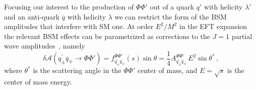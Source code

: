 Focusing our interest to the production of $\Phi\Phi'$ out of a quark $q'$ with helicity $\lambda'$ and an anti-quark ${\overline{q}}$ with helicity $\lambda$ we can restrict the form of the BSM amplitudes that interfere with SM one.
At order  $E^2/M^2$ in the EFT expansion the relevant BSM effects can be parametrized as corrections to the $J=1$ partial wave amplitudes~\cite{Franceschini:2017ab}, namely
\begin{equation}\label{amp0}
\delta{\mathcal{A}}\left(q^\prime_{\pm}{\overline{q}}_{\mp}\rightarrow\Phi\Phi'\right)= f^{\Phi\Phi'}_{q^\prime_{\pm}{\overline{q}}_{\mp}}(s)\sin\theta=  \frac{1}{4} A^{\Phi\Phi'}_{q^\prime_{\pm}{\overline{q}}_{\mp}}\, E^2 \sin\theta^*\,,
\end{equation}
where $\theta^*$ is the scattering angle in the $\Phi\Phi'$ center of mass, and $E=\sqrt{s}$ is the center of mass energy.


